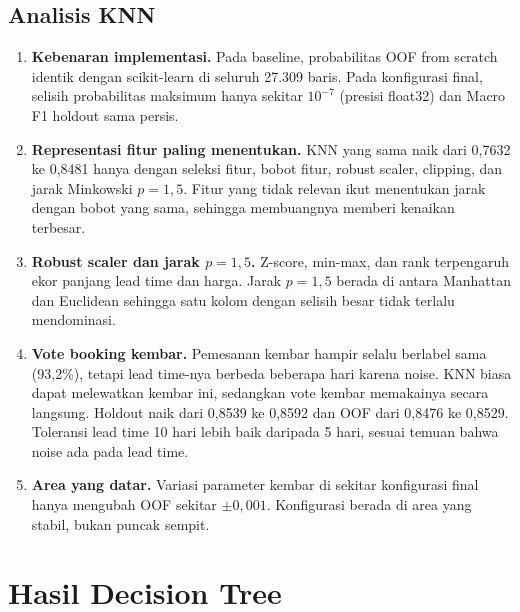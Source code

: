 \subsection{Analisis KNN}
\begin{enumerate}
  \item \textbf{Kebenaran implementasi.} Pada baseline, probabilitas OOF from scratch identik dengan scikit-learn di seluruh 27.309 baris. Pada konfigurasi final, selisih probabilitas maksimum hanya sekitar $10^{-7}$ (presisi float32) dan Macro F1 holdout sama persis.
  \item \textbf{Representasi fitur paling menentukan.} KNN yang sama naik dari 0,7632 ke 0,8481 hanya dengan seleksi fitur, bobot fitur, robust scaler, clipping, dan jarak Minkowski $p=1{,}5$. Fitur yang tidak relevan ikut menentukan jarak dengan bobot yang sama, sehingga membuangnya memberi kenaikan terbesar.
  \item \textbf{Robust scaler dan jarak $p=1{,}5$.} Z-score, min-max, dan rank terpengaruh ekor panjang lead time dan harga. Jarak $p=1{,}5$ berada di antara Manhattan dan Euclidean sehingga satu kolom dengan selisih besar tidak terlalu mendominasi.
  \item \textbf{Vote booking kembar.} Pemesanan kembar hampir selalu berlabel sama (93,2\%), tetapi lead time-nya berbeda beberapa hari karena noise. KNN biasa dapat melewatkan kembar ini, sedangkan vote kembar memakainya secara langsung. Holdout naik dari 0,8539 ke 0,8592 dan OOF dari 0,8476 ke 0,8529. Toleransi lead time 10 hari lebih baik daripada 5 hari, sesuai temuan bahwa noise ada pada lead time.
  \item \textbf{Area yang datar.} Variasi parameter kembar di sekitar konfigurasi final hanya mengubah OOF sekitar $\pm0{,}001$. Konfigurasi berada di area yang stabil, bukan puncak sempit.
\end{enumerate}

\section{Hasil Decision Tree}


